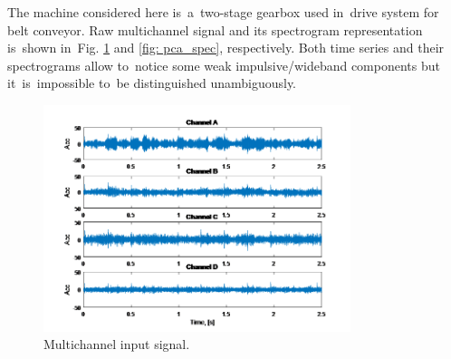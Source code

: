 The machine considered here is~a~two-stage gearbox used in~drive system for belt conveyor. Raw multichannel signal and its spectrogram representation is~shown in~Fig. \ref{fig: pca_raw} and \ref{fig: pca_spec}, respectively. Both time series and their spectrograms allow to~notice some weak impulsive/wideband components but it~is~impossible to~be distinguished unambiguously.



\begin{figure}[ht!]
\centering
\includegraphics[width = 0.8\textwidth]{wykresy/pca_raw.png}
\caption{Multichannel input signal.}
\label{fig: pca_raw}
\vspace{-10px}
\end{figure}


